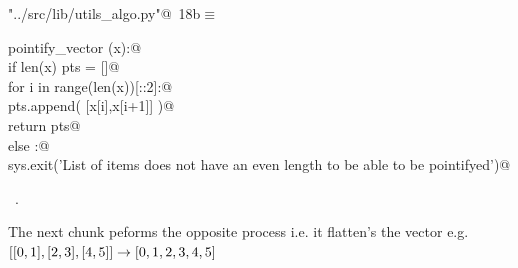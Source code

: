 \documentclass[11.5pt]{report}
\begin{document}
\begin{flushleft} \small
\begin{minipage}{\linewidth}\label{scrap14}\raggedright\small
{} \verb@"../src/lib/utils_algo.py"@\nobreak\ {\footnotesize {18b}}$\equiv$
\vspace{-1ex}
\begin{list}{}{} \item
\mbox{}\verb@def pointify_vector (x):@\\
\mbox{}\verb@    if len(x) % 2 == 0:@\\
\mbox{}\verb@        pts = []@\\
\mbox{}\verb@        for i in range(len(x))[::2]:@\\
\mbox{}\verb@            pts.append( [x[i],x[i+1]] )@\\
\mbox{}\verb@        return pts@\\
\mbox{}\verb@    else :@\\
\mbox{}\verb@        sys.exit('List of items does not have an even length to be able to be pointifyed')@\\
\mbox{}\verb@@{\NWsep}
\end{list}
\vspace{-1.5ex}
\footnotesize
\begin{list}{}{\setlength{\itemsep}{-\parsep}\setlength{\itemindent}{-\leftmargin}}
\item \NWtxtFileDefBy\ .

\item{}
\end{list}
\end{minipage}\vspace{4ex}
\end{flushleft}

\vspace{-0.8cm}
The next chunk peforms the opposite process i.e. it flatten's the vector
e.g. $[[0,1],[2,3],[4,5]] \rightarrow [0,1,2,3,4,5]$
\end{document}
